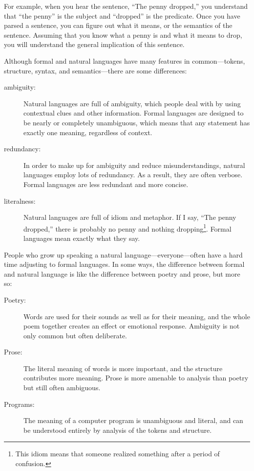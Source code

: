 \documentclass[10pt]{book}
\begin{document}

For example, when you hear the sentence, ``The penny dropped,'' you
understand that ``the penny'' is the subject and ``dropped'' is the
predicate.  Once you have parsed a sentence, you can figure out what it
means, or the semantics of the sentence.  Assuming that you know
what a penny is and what it means to drop, you will understand the
general implication of this sentence.

Although formal and natural languages have many features in
common---tokens, structure, syntax, and semantics---there are some
differences:


\begin{description}

\item[ambiguity:] Natural languages are full of ambiguity, which
people deal with by using contextual clues and other information.
Formal languages are designed to be nearly or completely unambiguous,
which means that any statement has exactly one meaning,
regardless of context.

\item[redundancy:] In order to make up for ambiguity and reduce
misunderstandings, natural languages employ lots of
redundancy.  As a result, they are often verbose.  Formal languages
are less redundant and more concise.

\item[literalness:] Natural languages are full of idiom and metaphor.
If I say, ``The penny dropped,'' there is probably no penny and
nothing dropping\footnote{This idiom means that someone realized something
after a period of confusion.}.  Formal languages
mean exactly what they say.

\end{description}

People who grow up speaking a natural language---everyone---often have a
hard time adjusting to formal languages.  In some ways, the difference
between formal and natural language is like the difference between
poetry and prose, but more so:


\begin{description}

\item[Poetry:] Words are used for their sounds as well as for
their meaning, and the whole poem together creates an effect or
emotional response.  Ambiguity is not only common but often
deliberate.

\item[Prose:] The literal meaning of words is more important,
and the structure contributes more meaning.  Prose is more amenable to
analysis than poetry but still often ambiguous.

\item[Programs:] The meaning of a computer program is unambiguous
and literal, and can be understood entirely by analysis of the
tokens and structure.

\end{description}
\end{document}
